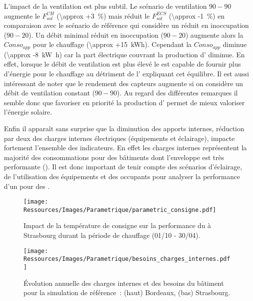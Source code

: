 L’impact de la ventilation est plus subtil. Le scénario de ventilation $90-90$
augmente le $F_{sol}^{CH}$ (\SI{\approx +3}{\percent}) mais réduit le $F_{sol}^{ECS}$
(\SI{\approx -1}{\percent}) en comparaison avec le scénario de référence qui considère un
réduit en inoccupation ($90-20$). Un débit minimal réduit en inoccupation ($90-20$) augmente
alors la $Conso_{app}$ pour le chauffage (\SI{\approx +15}{kWh}). Cependant la
$Conso_{app}$ diminue (\SI{\approx -8}{\kilo\watt\hour}) car la part
électrique couvrant la production d’ diminue. En effet, lorsque le débit de ventilation
est plus élevé le  est capable de fournir plus d’énergie pour le chauffage au
détriment de l’ expliquant cet équilibre. Il est aussi intéressant de noter que le
rendement des capteurs augmente si on considère un débit de ventilation constant
($90-90$). Au regard des différentes remarques il semble donc que
favoriser en priorité la production d’ permet de mieux valoriser l’énergie solaire.

Enfin il apparaît sans surprise que la diminution des apports internes, réduction par deux
des charges internes électriques (équipements et éclairage), impacte fortement l’ensemble
des indicateurs. En effet les charges internes représentent la majorité des consommations
pour des bâtiments dont l’enveloppe est très performante ().
Il est donc important de tenir compte des scénarios d’éclairage, de l’utilisation des
équipements et des occupants pour analyser la performance d’un  pour des
.

\begin{figure}
    \centering
    \texttt{[image: Ressources/Images/Parametrique/parametric\_consigne.pdf]}
    \caption[Impact de la température de consigne sur la performance du ]
            {Impact de la température de consigne sur la performance
             du  à Strasbourg durant la période de chauffage (01/10 - 30/04).}
    \label{fig:impact_temp_consigne}
\end{figure}

\begin{figure}
    \centering
    \texttt{[image: Ressources/Images/Parametrique/besoins\_charges\_internes.pdf]}
    \caption[Évolution annuelle des charges internes et des besoins du bâtiment]
            {Évolution annuelle des charges internes et des besoins du bâtiment
             pour la simulation de référence~: (haut) Bordeaux, (bas) Strasbourg.}
    \label{fig:besoins_charges_internes}
\end{figure}


